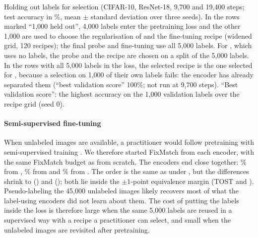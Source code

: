 \begin{table}[t]
\centering
\small
\caption{Holding out labels for selection (CIFAR-10, ResNet-18, 9,700 and 19,400 steps; test accuracy in \%, mean $\pm$
standard deviation over three seeds). In the rows marked ``1,000 held out'', 4,000 labels enter the pretraining
loss and the other 1,000 are used to choose the regularisation of \lpfive and the fine-tuning recipe (widened
grid, 120 recipes); the final probe and fine-tuning use all 5,000 labels. For \simclr, which uses no labels,
the probe and the recipe are chosen on a split of the 5,000 labels. In the rows with all 5,000 labels in the
loss, the selected recipe is the one selected for \simclr, because a selection on 1,000 of their own labels fails:
the encoder has already separated them (``best validation score'' 100\%; not run at 9,700 steps). ``Best validation
score'': the highest accuracy on the 1,000 validation labels over the recipe grid (seed 0).}
\label{tab:heldout}
\begin{adjustbox}{max width=\linewidth}

\end{adjustbox}
\end{table}

\paragraph{Semi-supervised fine-tuning}
When unlabeled images are available, a practitioner would follow pretraining with semi-supervised training
\citep{chen2020simclrv2}. We therefore started FixMatch from each encoder, with the same FixMatch budget as
from scratch. The encoders end close together: \% from \simclr,
\% from \supcon and \% from \union. The order is the
same as under \ftfive, but the differences shrink to \pt
() and \pt ();
both lie inside the $\pm1$-point equivalence margin (TOST  and
). Pseudo-labeling the 45,000 unlabeled images likely recovers most of
what the label-using encoders did not learn about them. The cost of putting the labels inside the loss is
therefore large when the same 5,000 labels are reused in a supervised way with a recipe a practitioner can
select, and small when the unlabeled images are revisited after pretraining.

